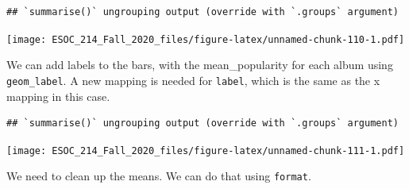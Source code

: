 \documentclass[
]{book}
\newenvironment{Shaded}{\begin{snugshade}}{\end{snugshade}}
\newcommand{\DataTypeTok}[1]{\textcolor[rgb]{0.13,0.29,0.53}{#1}}
\newcommand{\DecValTok}[1]{\textcolor[rgb]{0.00,0.00,0.81}{#1}}
\newcommand{\KeywordTok}[1]{\textcolor[rgb]{0.13,0.29,0.53}{\textbf{#1}}}
\newcommand{\NormalTok}[1]{#1}
\newcommand{\OperatorTok}[1]{\textcolor[rgb]{0.81,0.36,0.00}{\textbf{#1}}}
\newcommand{\StringTok}[1]{\textcolor[rgb]{0.31,0.60,0.02}{#1}}
\begin{document}
\begin{verbatim}
## `summarise()` ungrouping output (override with `.groups` argument)
\end{verbatim}

\texttt{[image: ESOC\_214\_Fall\_2020\_files/figure-latex/unnamed-chunk-110-1.pdf]}

We can add labels to the bars, with the mean\_popularity for each album using \texttt{geom\_label}. A new mapping is needed for \texttt{label}, which is the same as the x mapping in this case.

\begin{Shaded}
\end{Shaded}

\begin{verbatim}
## `summarise()` ungrouping output (override with `.groups` argument)
\end{verbatim}

\texttt{[image: ESOC\_214\_Fall\_2020\_files/figure-latex/unnamed-chunk-111-1.pdf]}

We need to clean up the means. We can do that using \texttt{format}.

\begin{Shaded}
\end{Shaded}
\end{document}
